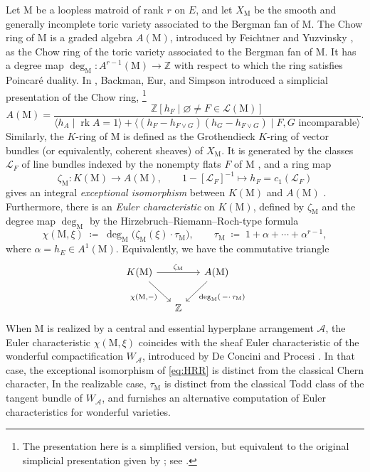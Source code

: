 \documentclass[11pt,a4paper,reqno]{amsart}
\theoremstyle{results}
\theoremstyle{definitions}
\def\Z{\mathbb{Z}}
\def\Z{\mathbb{Z}}
\def\calA{\mathcal{A}}
\def\calL{\mathcal{L}}
\newcommand{\rk}{\operatorname{rk}}
\newcommand{\M}{\mathrm{M}}
\newcommand{\cL}{\mathcal{L}}
\begin{document}
Let $\M$ be a loopless matroid of rank $r$ on $E$, and let $X_{\M}$ be the smooth and generally incomplete toric variety associated to the Bergman fan of $\M$. The Chow ring of $\M$ is a graded algebra $A(\M)$, introduced by Feichtner and Yuzvinsky \cite{feichtner2004chow}, as the Chow ring of the toric variety
associated to the Bergman fan of $\M$. It has a degree map $\deg_{\M} \colon A^{r-1}(\M) \to \Z$ with respect to which the ring satisfies Poincar\'{e} duality.
In \cite{backman2024simplicial}, Backman, Eur, and Simpson introduced a simplicial presentation of the Chow ring, \footnote{The presentation here is a simplified version, but equivalent to the original simplicial presentation given by \cite{backman2024simplicial}; see \cite[Appendix]{larson2024k}.}
\[
A(\M) = \frac{\Z[h_F \mid \varnothing \ne F \in \calL(\M)]}{\langle h_A \mid \rk A=1 \rangle + \langle (h_F-h_{F\vee G})(h_G-h_{F\vee G}) \mid F,G \text{ incomparable}\rangle}.
\]
Similarly, the $K$-ring of $\M$ is defined as the Grothendieck $K$-ring of vector bundles (or equivalently, coherent sheaves) of $X_{\M}$.
It is generated by the classes $\cL_F$ of line bundles indexed by the
nonempty flats $F$ of $\M$ \cite[Lemma 1.20]{larson2024k}, and a ring map 
\[
\zeta_{\M} \colon K(\M) \to A(\M), \qquad 1 - [\calL_{F}]^{-1} \mapsto h_F = c_1(\calL_F)
\] gives an integral \emph{exceptional isomorphism} between $K(\M)$ and $A(\M)$ \cite[Theorem
1.16]{larson2024k}. Furthermore,
there is an \emph{Euler
characteristic} on $K(\M)$, defined by $\zeta_{\M}$ and the degree map
$\deg_{\M}$ by the Hirzebruch--Riemann--Roch-type formula
\begin{equation}\label{eq:HRR}
  \chi(\M, \xi) \;\coloneqq\; \deg_{\M}\!\big( \zeta_{\M}(\xi) \cdot \tau_{\M} \big),
  \qquad \tau_{\M} \;\coloneqq\; 1 + \alpha + \cdots + \alpha^{r-1},
\end{equation}
where $\alpha=h_E\in A^1(\M)$. 
Equivalently, we have the commutative triangle
\[
  \begin{tikzcd}[row sep=2em, column sep=1.4em]
    K(\M) \arrow[rr, "\zeta_{\M}"] \arrow[dr, "{\chi(\M,-)}"'] & & A(\M) \arrow[dl, "{\deg_{\M}(\,-\cdot\,\tau_{\M})}"] \\
    & \Z &
  \end{tikzcd}
\] When $\M$ is realized by a central and essential hyperplane arrangement $\calA$, the Euler characteristic $\chi(\M, \xi)$ coincides with the sheaf Euler characteristic of
the wonderful compactification $W_{\calA}$, introduced by De Concini and Procesi \cite{deconcini1995wonderful}. In that case, the exceptional isomorphism of \eqref{eq:HRR} is distinct from the classical Chern character, In the realizable case, $\tau_{\M}$ is distinct from the classical Todd class of the tangent bundle of $W_{\calA}$, and furnishes an alternative computation of Euler characteristics for wonderful varieties.
\end{document}
